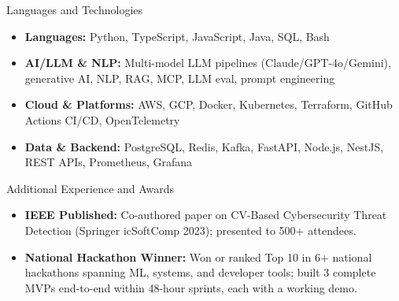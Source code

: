 \documentclass[]{mcdowellcv}
\begin{document}
\begin{cvsection}{Languages and Technologies}
  \begin{cvsubsection}{}{}{}
    \begin{itemize}
      \item \textbf{Languages:} Python, TypeScript, JavaScript, Java, SQL, Bash
      \item \textbf{AI/LLM \& NLP:} Multi-model LLM pipelines (Claude/GPT-4o/Gemini), generative AI, NLP, RAG, MCP, LLM eval, prompt engineering
      \item \textbf{Cloud \& Platforms:} AWS, GCP, Docker, Kubernetes, Terraform, GitHub Actions CI/CD, OpenTelemetry
      \item \textbf{Data \& Backend:} PostgreSQL, Redis, Kafka, FastAPI, Node.js, NestJS, REST APIs, Prometheus, Grafana
    \end{itemize}
  \end{cvsubsection}
\end{cvsection}

\begin{cvsection}{Additional Experience and Awards}
  \begin{cvsubsection}{}{}{}
    \begin{itemize}
      \item \textbf{IEEE Published:} Co-authored paper on CV-Based Cybersecurity Threat Detection (Springer icSoftComp 2023); presented to 500+ attendees.
      \item \textbf{National Hackathon Winner:} Won or ranked Top 10 in 6+ national hackathons spanning ML, systems, and developer tools; built 3 complete MVPs end-to-end within 48-hour sprints, each with a working demo.
    \end{itemize}
  \end{cvsubsection}
\end{cvsection}
\end{document}
